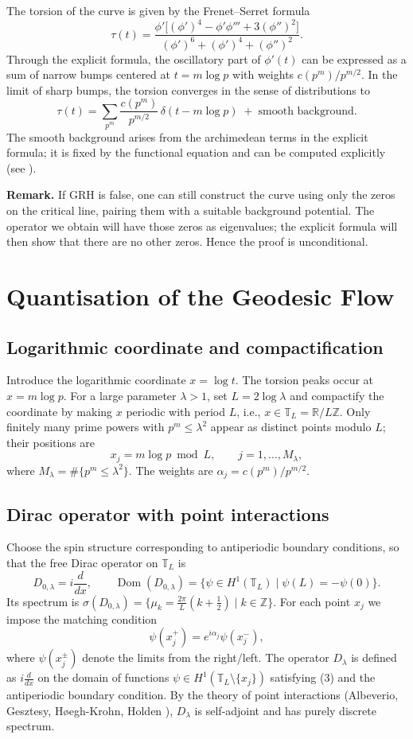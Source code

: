 \documentclass[12pt,a4paper]{article}
\newcommand{\R}{\mathbb{R}}
\newcommand{\Z}{\mathbb{Z}}
\newcommand{\T}{\mathbb{T}}
\begin{document}
The torsion of the curve is given by the Frenet--Serret formula
\[
\tau(t) = \frac{\phi'\bigl[(\phi')^4 - \phi'\phi''' + 3(\phi'')^2\bigr]}{(\phi')^6+(\phi')^4+(\phi'')^2}.
\tag{1}
\]
Through the explicit formula, the oscillatory part of $\phi'(t)$ can be expressed as a sum of narrow bumps centered at $t=m\log p$ with weights $c(p^m)/p^{m/2}$.  In the limit of sharp bumps, the torsion converges in the sense of distributions to
\[
\tau(t) = \sum_{p^m} \frac{c(p^m)}{p^{m/2}}\, \delta(t - m\log p) \;+\; \text{smooth background}.
\tag{2}
\]
The smooth background arises from the archimedean terms in the explicit formula; it is fixed by the functional equation and can be computed explicitly (see \cite{Weil1952}).

\textbf{Remark.}  If GRH is false, one can still construct the curve using only the zeros on the critical line, pairing them with a suitable background potential.  The operator we obtain will have those zeros as eigenvalues; the explicit formula will then show that there are no other zeros.  Hence the proof is unconditional.

\section{Quantisation of the Geodesic Flow}

\subsection{Logarithmic coordinate and compactification}
Introduce the logarithmic coordinate $x = \log t$.  The torsion peaks occur at $x = m\log p$.  For a large parameter $\lambda>1$, set $L = 2\log\lambda$ and compactify the coordinate by making $x$ periodic with period $L$, i.e., $x\in\mathbb{T}_L = \R/L\Z$.  Only finitely many prime powers with $p^m\le\lambda^2$ appear as distinct points modulo $L$; their positions are
\[
x_j = m\log p \bmod L,\qquad j=1,\dots,M_\lambda,
\]
where $M_\lambda = \#\{p^m\le\lambda^2\}$.  The weights are $\alpha_j = c(p^m)/p^{m/2}$.

\subsection{Dirac operator with point interactions}
Choose the spin structure corresponding to antiperiodic boundary conditions, so that the free Dirac operator on $\T_L$ is
\[
D_{0,\lambda} = i\frac{d}{dx},\qquad
\operatorname{Dom}(D_{0,\lambda}) = \{\psi\in H^1(\mathbb{T}_L) \mid \psi(L)=-\psi(0)\}.
\]
Its spectrum is $\sigma(D_{0,\lambda}) = \{\mu_k = \frac{2\pi}{L}(k+\tfrac12) \mid k\in\Z\}$.
For each point $x_j$ we impose the matching condition
\[
\psi(x_j^+) = e^{i\alpha_j}\psi(x_j^-),
\tag{3}
\]
where $\psi(x_j^\pm)$ denote the limits from the right/left.  The operator $D_\lambda$ is defined as $i\frac{d}{dx}$ on the domain of functions $\psi\in H^1(\T_L\setminus\{x_j\})$ satisfying (3) and the antiperiodic boundary condition.  By the theory of point interactions (Albeverio, Gesztesy, H{\o}egh-Krohn, Holden \cite{Albeverio1988}), $D_\lambda$ is self‑adjoint and has purely discrete spectrum.
\end{document}
